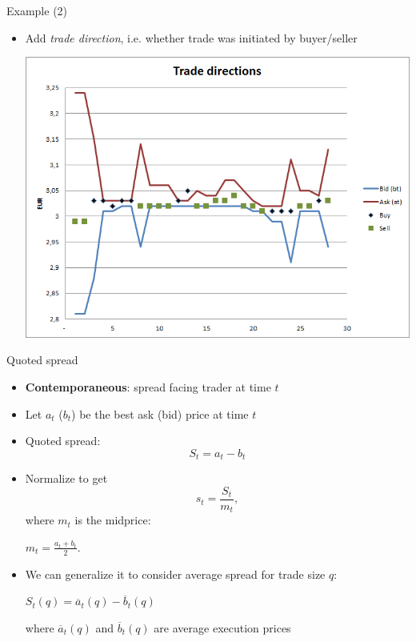 \documentclass[english,10pt]{beamer}
\begin{document}
\begin{frame}{Example (2)}
	\begin{itemize}
		\item Add \textit{trade direction}, i.e. whether trade was initiated by buyer/seller
		\begin{center}
			\includegraphics[scale=0.39]{pics/L2_directions}
		\end{center}
	\end{itemize}
\end{frame}


\begin{frame}{Quoted spread}
	\begin{itemize}
		\item \textbf{Contemporaneous}: spread facing trader at time $t$
		\item Let $a_t$ ($b_t$) be the best ask (bid) price at time $t$
		\item \alert{Quoted spread}:
		\[
		S_t = a_t -b_t
		\]
		\item Normalize to get 
		\[
		s_t = \frac{S_t}{m_t},
		\]
		where $m_t$ is the midprice:
		\begin{center}
			$
			m_t = \frac{a_t+b_t}{2}.
			$
		\end{center}
		\item We can generalize it to consider average spread for trade size $q$: 
		\begin{center}$S_t(q)=\overline{a}_t(q)-\overline{b}_t(q)$\end{center}
		where $\overline{a}_t(q)$ and $\overline{b}_t(q)$ are average execution prices
	\end{itemize}
\end{frame}
\end{document}
